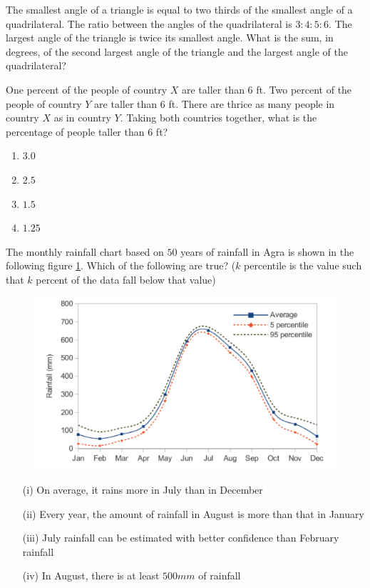     \item The smallest angle of a triangle is equal to two thirds of the smallest angle of a quadrilateral. The ratio between the angles of the quadrilateral is $3:4:5:6$. The largest angle of the triangle is twice its smallest angle. What is the sum, in degrees, of the second largest angle of the triangle and the largest angle of the quadrilateral?
    \item One percent of the people of country $X$ are taller than $6$ ft. Two percent of the people of country $Y$ are taller than $6$ ft. There are thrice as many people in country $X$ as in country $Y$. Taking both countries together, what is the percentage of people taller than $6$ ft?
        \begin{enumerate}
            \item $3.0$
            \item $2.5$
            \item $1.5$
            \item $1.25$
        \end{enumerate}

    \item \label{10} The monthly rainfall chart based on $50$ years of rainfall in Agra is shown in the following figure \ref{10fig}. Which of the following are true? ($k$ percentile is the value such that $k$ percent of the data fall below that value)
        \begin{figure}[H]
            \centering
            \includegraphics[width = 1\linewidth]{Gate-yearwise/AI24BTECH11015/figs/10.png}
            \caption{}
            \label{10fig}
        \end{figure}

        \begin{itemize}
            \item[(i)] On average, it rains more in July than in December
            \item[(ii)] Every year, the amount of rainfall in August is more than that in January
            \item[(iii)] July rainfall can be estimated with better confidence than February rainfall
            \item[(iv)] In August, there is at least $500 mm$ of rainfall
        \end{itemize}

